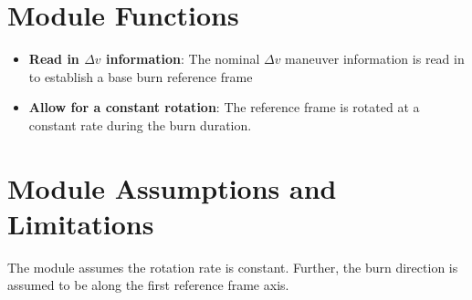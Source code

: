 

\section{Module Functions}
\begin{itemize}
	\item \textbf{Read in $\Delta v$ information}: The nominal $\Delta v$ maneuver information is read in to establish a base burn reference frame
	\item \textbf{Allow for a constant rotation}: The reference frame is rotated at a constant rate during the burn duration.
\end{itemize}

\section{Module Assumptions and Limitations}
The module assumes the rotation rate is constant.  Further, the burn direction is assumed to be along the first reference frame axis.